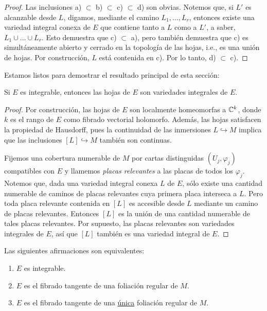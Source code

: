 \begin{proof}
Las inclusiones a) $\subset$ b) $\subset$ c) $\subset$ d) son obvias. Notemos que, si $L'$ es alcanzable desde $L$, digamos, mediante el camino $L_1, \dots, L_r$, entonces existe una variedad integral conexa de $E$ que contiene tanto a $L$ como a $L'$, a saber, $L_1 \cup \dots \cup L_r$. Esto demuestra que c) $\subset$ a), pero también demuestra que c) es simultáneamente abierto y cerrado en la topología de las hojas, i.e., es una unión de hojas. Por construcción, $L$ está contenida en c). Por lo tanto, d) $\subset$ c).
\end{proof}

Estamos listos para demostrar el resultado principal de esta sección:

\begin{theorem}
Si $E$ es integrable, entonces las hojas de $E$ son variedades integrales de $E$.
\end{theorem}

\begin{proof}
Por construcción, las hojas de $E$ son localmente homeomorfas a $\mathbb C^k$, donde $k$ es el rango de $E$ como fibrado vectorial holomorfo. Además, las hojas satisfacen la propiedad de Hausdorff, pues la continuidad de las inmersiones $L \hookrightarrow M$ implica que las inclusiones $[L] \hookrightarrow M$ también son continuas.

Fijemos una cobertura numerable de $M$ por cartas distinguidas $(U_j, \varphi_j)$ compatibles con $E$ y llamemos \textit{placas relevantes} a las placas de todos los $\varphi_j$. Notemos que, dada una variedad integral conexa $L$ de $E$, sólo existe una cantidad numerable de caminos de placas relevantes cuya primera placa interseca a $L$. Pero toda placa relevante contenida en $[L]$ es accesible desde $L$ mediante un camino de placas relevantes. Entonces $[L]$ es la unión de una cantidad numerable de tales placas relevantes. Por supuesto, las placas relevantes son variedades integrales de $E$, así que $[L]$ también es una variedad integral de $E$.
\end{proof}

\begin{corollary}
Las siguientes afirmaciones son equivalentes:
\begin{enumerate}[label=\alph*)]
    \itemsep 0em
    \item $E$ es integrable.
    \item $E$ es el fibrado tangente de una foliación regular de $M$.
    \item $E$ es el fibrado tangente de una \underline{única} foliación regular de $M$.
\end{enumerate}
\end{corollary}

